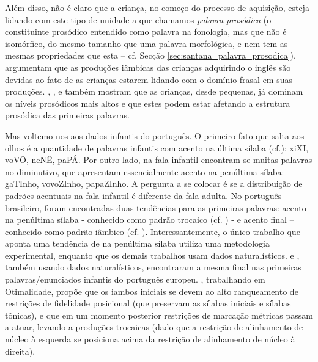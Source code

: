 \documentclass[output=paper]{LSP/langsci}
\begin{document}
Além disso, não é claro que a criança, no começo do processo de aquisição, esteja lidando com este tipo de unidade a que chamamos \textit{palavra prosódica} (o constituinte prosódico entendido como palavra na fonologia, mas que não é isomórfico, do mesmo tamanho que uma palavra morfológica, e nem tem as mesmas propriedades que esta – cf. Secção \ref{sec:santana_palavra_prosodica}). \citet{vihman_etal1998} argumentam que as produções iâmbicas das crianças adquirindo o inglês são devidas ao fato de as crianças estarem lidando com o domínio frasal em suas produções. \citet{correia_etal2006}, \citet{grimm2006}, \citet{correia2009} e \citet{frotavigario2008} também mostram que as crianças, desde pequenas, já dominam os níveis prosódicos mais altos e que estes podem estar afetando a estrutura prosódica das primeiras palavras.

Mas voltemo-nos aos dados infantis do português. O primeiro fato que salta aos olhos é a quantidade de palavras infantis com acento na última sílaba (cf.\citealt{stoelgammon1976}): xiXI, voVÔ, neNÊ, paPÁ. Por outro lado, na fala infantil encontram-se muitas palavras no diminutivo, que apresentam essencialmente acento na penúltima sílaba: gaTInho, vovoZInho, papaZInho. A pergunta a se colocar é se a distribuição de padrões acentuais na fala infantil é diferente da fala adulta. No português brasileiro, foram encontradas duas tendências para as primeiras palavras: acento na penúltima sílaba - conhecido como padrão trocaico (cf. \citealt{rapp1994}) - e acento final – conhecido como padrão iâmbico (cf. \citealt{santos2001,santos2007,bonilha2004,baia2008,baia2012,ferreiragoncalcesbrum2011}). Interessantemente, o único trabalho que aponta uma tendência de  na penúltima sílaba utiliza uma metodologia experimental, enquanto que os demais trabalhos usam dados naturalísticos. \citet{correia_etal2006} e \citet{correia2009}, também usando dados naturalísticos, encontraram a mesma  final nas primeiras palavras/enunciados infantis do português europeu. \citet{bonilha2004}, trabalhando em Otimalidade, propõe que os iambos iniciais se devem ao alto ranqueamento de restrições de fidelidade posicional (que preservam as sílabas iniciais e sílabas tônicas), e que em um momento posterior restrições de marcação métricas passam a atuar, levando a produções trocaicas (dado que a restrição de alinhamento de núcleo à esquerda se posiciona acima da restrição de alinhamento de núcleo à direita).
\end{document}
